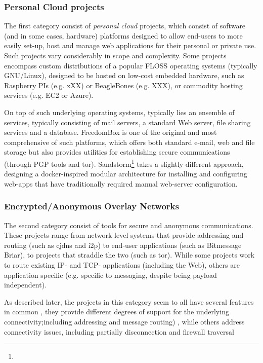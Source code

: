 \documentclass{amsart}
\begin{document}
\subsubsection{Personal Cloud projects}

The first category consist of \emph{personal cloud} projects, which consist of software (and in some cases, hardware) platforms designed to allow end-users to more easily set-up, host and manage web applications for their personal or private use.  Such projects vary considerably in scope and complexity. Some projects encompass custom distributions of a popular FLOSS operating systems (typically GNU/Linux), designed to be hosted on low-cost embedded hardware, such as Raspberry PIs (e.g. xXX) or BeagleBones (e.g. XXX), or commodity hosting services (e.g. EC2 or Azure). 

On top of such underlying operating systems, typically lies an ensemble of services, typically consisting of mail servers, a standard Web server, file sharing services and a database. FreedomBox is one of the original and most comprehensive of such platforms, which offers both standard e-mail, web and file storage but also provides utilities for establishing secure communications (through PGP tools and tor).  Sandstorm\footnote{} takes a slightly different approach, designing a docker-inspired modular architecture for installing and configuring web-apps that have traditionally required manual web-server configuration. 

\subsubsection{Encrypted/Anonymous Overlay Networks}

The second category consist of tools for secure and anonymous communications.  These projects range from network-level systems that provide addressing and routing (such as cjdns and i2p) to end-user applications (such as Bitmessage Briar), to projects that straddle the two (such as tor). While some projects work to route existing IP- and TCP- applications (including the Web), others are application specific (e.g. specific to messaging, despite being payload independent).

As described later, the projects in this category seem to all have several features in common , they provide different degrees of support for the underlying connectivity;including addressing and message routing) , while others address connectivity issues, including partially disconnection and firewall traversal
\end{document}
